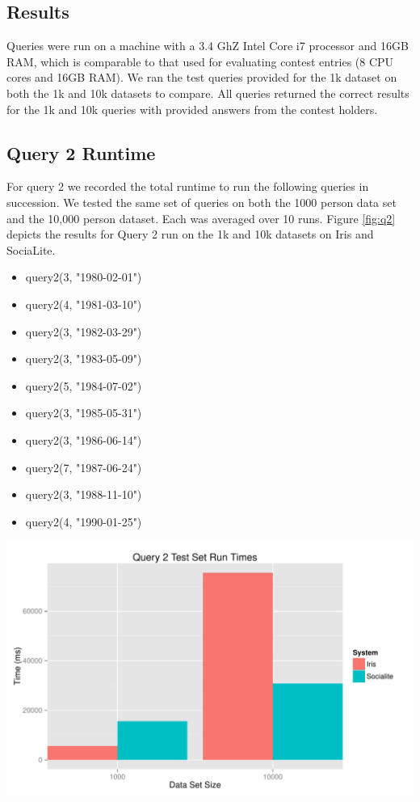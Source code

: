 \documentclass{article}
\begin{document}
\begin{multicols}{2}
\section{Results}
Queries were run on a machine with a 3.4 GhZ Intel Core i7 processor and 16GB RAM, which is comparable to that used for evaluating contest entries (8 CPU cores and 16GB RAM). We ran the test queries provided for the 1k dataset on both the 1k and 10k datasets to compare. All queries returned the correct results for the 1k and 10k queries with provided answers from the contest holders. 

\subsection {Query 2 Runtime}
For query 2 we recorded the total runtime to run the following queries in succession. We tested the same set of queries on both the 1000 person data set and the 10,000 person dataset. Each was averaged over 10 runs. Figure \ref{fig:q2} depicts the results for Query 2 run on the 1k and 10k datasets on Iris and SociaLite. 
\begin{itemize}
\item query2(3, "1980-02-01")
\item query2(4, "1981-03-10")
\item query2(3, "1982-03-29")
\item query2(3, "1983-05-09")
\item query2(5, "1984-07-02")
\item query2(3, "1985-05-31")
\item query2(3, "1986-06-14")
\item query2(7, "1987-06-24")
\item query2(3, "1988-11-10")
\item query2(4, "1990-01-25")
\end{itemize}
\begingroup
    \centering
    \includegraphics[scale=0.4]{../results/query2.pdf}
    \label{fig:q2}
\endgroup



\end{multicols}
\end{document}
